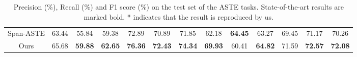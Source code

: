 \documentclass[11pt]{article}
\begin{document}
\begin{table*}[h]
{\begin{tabular}{c|ccc|ccc|ccc|ccc}
			Span-ASTE      & 63.44          & 55.84          & 59.38          & 72.89  & 70.89          & 71.85          & 62.18          & \textbf{64.45} & 63.27          & 69.45          & 71.17          & 70.26          \\
			Ours           & 65.68 & \textbf{59.88} & \textbf{62.65} & \textbf{76.36}  & \textbf{72.43} & \textbf{74.34} & \textbf{69.93} & 60.41          & \textbf{64.82} & 71.59          & \textbf{72.57} & \textbf{72.08} \\ \hline
	\end{tabular}}
	\caption{Precision (\%), Recall (\%) and F1 score (\%) on the test set of the ASTE tasks. State-of-the-art results are marked bold. * indicates that the result is reproduced by us.}
	\label{main result}
\end{table*}
\end{document}
